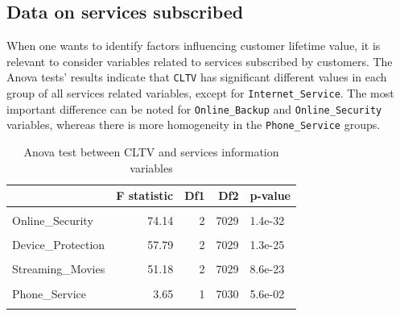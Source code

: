 \documentclass[
]{book}
\begin{document}
\hypertarget{data-on-services-subscribed-1}{%
\subsection*{Data on services subscribed}\label{data-on-services-subscribed-1}}

When one wants to identify factors influencing customer lifetime value, it is relevant to consider variables related to services subscribed by customers. The Anova tests' results indicate that \texttt{CLTV} has significant different values in each group of all services related variables, except for \texttt{Internet\_Service}. The most important difference can be noted for \texttt{Online\_Backup} and \texttt{Online\_Security} variables, whereas there is more homogeneity in the \texttt{Phone\_Service} groups.

\begin{table}[H]

\caption{\label{tab:aovservices}Anova test between CLTV and services information variables}
\centering
\begin{tabular}[t]{lrrrl}
\toprule
  & F statistic & Df1 & Df2 & p-value\\
\midrule
\cellcolor{gray!6}{Online\_Backup} & \cellcolor{gray!6}{76.75} & \cellcolor{gray!6}{2} & \cellcolor{gray!6}{7029} & \cellcolor{gray!6}{1.1e-33}\\
Online\_Security & 74.14 & 2 & 7029 & 1.4e-32\\
\cellcolor{gray!6}{Multiple\_Lines} & \cellcolor{gray!6}{64.81} & \cellcolor{gray!6}{2} & \cellcolor{gray!6}{7029} & \cellcolor{gray!6}{1.3e-28}\\
Device\_Protection & 57.79 & 2 & 7029 & 1.3e-25\\
\cellcolor{gray!6}{Tech\_Support} & \cellcolor{gray!6}{54.33} & \cellcolor{gray!6}{2} & \cellcolor{gray!6}{7029} & \cellcolor{gray!6}{3.8e-24}\\
\addlinespace
Streaming\_Movies & 51.18 & 2 & 7029 & 8.6e-23\\
\cellcolor{gray!6}{Streaming\_TV} & \cellcolor{gray!6}{44.43} & \cellcolor{gray!6}{2} & \cellcolor{gray!6}{7029} & \cellcolor{gray!6}{6.7e-20}\\
Phone\_Service & 3.65 & 1 & 7030 & 5.6e-02\\
\cellcolor{gray!6}{Internet\_Service} & \cellcolor{gray!6}{0.56} & \cellcolor{gray!6}{2} & \cellcolor{gray!6}{7029} & \cellcolor{gray!6}{5.7e-01}\\
\bottomrule
\end{tabular}
\end{table}
\end{document}
